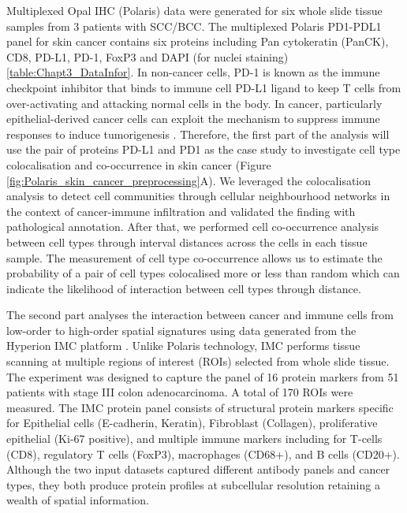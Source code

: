 Multiplexed Opal IHC (Polaris) data were generated for six whole slide tissue samples from 3 patients with SCC/BCC. The multiplexed Polaris PD1-PDL1 panel for skin cancer contains six proteins including Pan cytokeratin (PanCK), CD8, PD-L1, PD-1, FoxP3 and DAPI (for nuclei staining)  \ref{table:Chapt3_DataInfor}. In non-cancer cells, PD-1 is known as the immune checkpoint inhibitor that binds to immune cell PD-L1 ligand to keep T cells from over-activating and attacking normal cells in the body. In cancer, particularly epithelial-derived cancer cells can exploit the mechanism to suppress immune responses to induce tumorigenesis \cite{tsai2014pd, chen2013oncology}. Therefore, the first part of the analysis will use the pair of proteins PD-L1 and PD1 as the case study to investigate cell type colocalisation and co-occurrence in skin cancer (Figure \ref{fig:Polaris_skin_cancer_preprocessing}A). We leveraged the colocalisation analysis to detect cell communities through cellular neighbourhood networks in the context of cancer-immune infiltration and validated the finding with pathological annotation. After that, we performed cell co-occurrence analysis between cell types through interval distances across the cells in each tissue sample. The measurement of cell type co-occurrence  allows us to estimate the probability of a pair of cell types colocalised more or less than random which can indicate the likelihood of interaction between cell types through distance. 

The second part analyses the interaction between cancer and immune cells from low-order to high-order spatial signatures using data generated from the Hyperion IMC platform \cite{giesen2014IMC}. Unlike Polaris technology, IMC performs tissue scanning at multiple regions of interest (ROIs) selected from whole slide tissue. The experiment was designed to capture the panel of 16 protein markers from 51 patients with stage III colon adenocarcinoma. A total of 170 ROIs were measured. The IMC protein panel consists of structural protein markers specific for Epithelial cells (E-cadherin, Keratin), Fibroblast (Collagen), proliferative epithelial (Ki-67 positive), and multiple immune markers including for T-cells (CD8), regulatory T cells (FoxP3), macrophages (CD68+), and B cells (CD20+). Although the two input datasets captured different antibody panels and cancer types, they both produce protein profiles at subcellular resolution retaining a wealth of spatial information.    

